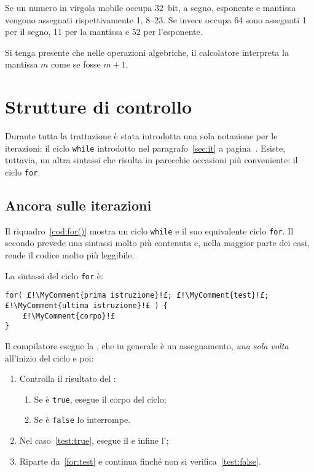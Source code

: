 Se un numero in virgola mobile occupa \SI{32}{bit}, a segno, esponente e mantissa vengono assegnati rispettivamente \SI{1}{\bit}, \SIrange[range-phrase={ e }]{8}{23}{\bit}.
Se invece occupa \SI{64}{\bit} sono assegnati \SI{1}{\bit} per il segno, \SI{11}{\bit} per la mantissa e \SI{52}{\bit} per l'esponente.

Si tenga presente che nelle operazioni algebriche, il calcolatore interpreta la mantissa $m$ come se fosse $m+1$.

	\section{Strutture di controllo}
Durante  tutta la trattazione è stata introdotta una sola notazione per le iterazioni: il ciclo \lstinline!while! introdotto nel paragrafo~\ref{sec:it} a pagina~\pageref{sec:it}.
Esiste, tuttavia, un altra sintassi che risulta in parecchie occasioni più conveniente: il ciclo \lstinline!for!.

		\subsection{Ancora sulle iterazioni}

Il riquadro~\ref{cod:for()} mostra un ciclo \lstinline!while! e il suo equivalente ciclo \lstinline!for!.
Il secondo prevede una sintassi molto più contenuta e, nella maggior parte dei casi, rende il codice molto più leggibile.



La sintassi del ciclo \lstinline!for! è:
\begin{lstlisting}
for( £!\MyComment{prima istruzione}!£; £!\MyComment{test}!£; £!\MyComment{ultima istruzione}!£ ) {
	£!\MyComment{corpo}!£
}
\end{lstlisting}

Il compilatore esegue la , che in generale è un assegnamento, \emph{una sola volta} all'inizio del ciclo e poi:
\begin{enumerate}
	\item\label{for:test}
Controlla il risultato del :
	\begin{enumerate}
		\item\label{test:true}
Se è \lstinline!true!, esegue il corpo del ciclo;
		\item\label{test:false}
 Se è \lstinline!false! lo interrompe.
\end{enumerate}
	\item
Nel caso~\ref{test:true}, esegue il  e infine l';
	\item
Riparte da~\ref{for:test} e continua finché non si verifica~\ref{test:false}.
\end{enumerate}

